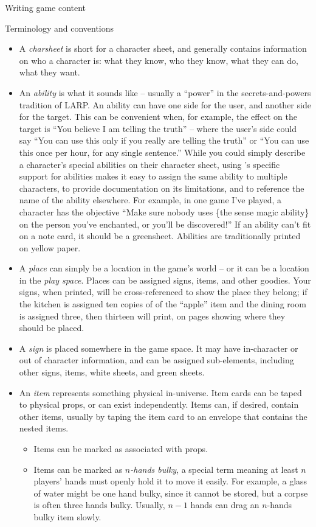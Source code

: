 \documentclass{article}
\begin{document}
\begin{section}{Writing game content}
\begin{subsection}{Terminology and conventions}
\begin{itemize}
    \item A \textit{charsheet} is short for a character sheet, and generally contains information on who a character is: what they know, who they know, what they can do, what they want.
    \item An \textit{ability} is what it sounds like – usually a ``power'' in the secrets-and-powers tradition of LARP.  An ability can have one side for the user, and another side for the target.  This can be convenient when, for example, the effect on the target is ``You believe I am telling the truth'' -- where the user's side could say ``You can use this only if you really are telling the truth'' or ``You can use this once per hour, for any single sentence.'' While you could simply describe a character's special abilities on their character sheet, using \gametex{}'s specific support for abilities makes it easy to assign the same ability to multiple characters, to provide documentation on its limitations, and to reference the name of the ability elsewhere.  For example, in one game I've played, a character has the objective ``Make sure nobody uses \{the sense magic ability\} on the person you've enchanted, or you'll be discovered!''  If an ability can't fit on a note card, it should be a greensheet.  Abilities are traditionally printed on yellow paper.
    \item A \textit{place} can simply be a location in the game's world -- or it can be a location in the \textit{play space}.  Places can be assigned signs, items, and other goodies.  Your signs, when printed, will be cross-referenced to show the place they belong; if the kitchen is assigned ten copies of of the ``apple'' item and the dining room is assigned three, then thirteen will print, on pages showing where they should be placed.
   \item A \textit{sign} is placed somewhere in the game space.  It may have in-character or out of character information, and can be assigned sub-elements, including other signs, items, white sheets, and green sheets.
  \item An \textit{item} represents something physical in-universe.  Item cards can be taped to physical props, or can exist independently.  Items can, if desired, contain other items, usually by taping the item card to an envelope that contains the nested items.
\begin{itemize}
\item  Items can be marked as associated with props.
\item   Items can be marked as \textit{$n$-hands bulky}, a special term meaning at least $n$ players' hands must openly hold it to move it easily.  For example, a glass of water might be one hand bulky, since it cannot be stored, but a corpse is often three hands bulky.  Usually, $n-1$ hands can drag an $n$-hands bulky item slowly.

\end{itemize}
\end{itemize}
\end{subsection}
\end{section}
\end{document}
